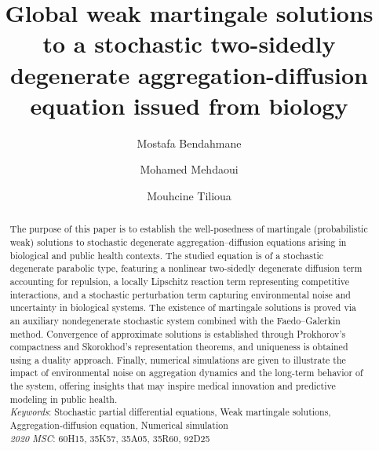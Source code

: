 \documentclass[10pt,number,preprint,times]{elsarticle}
\date{}
\numberwithin{equation}{section} %
\begin{document}
	\maketitle
		\begin{abstract}
		The purpose of this paper is to establish the well-posedness of martingale (probabilistic weak) solutions to stochastic degenerate aggregation–diffusion equations arising in biological and public health contexts. The studied equation is of a stochastic degenerate parabolic type, featuring a nonlinear two-sidedly degenerate diffusion term accounting for repulsion, a locally Lipschitz reaction term representing competitive interactions, and a stochastic perturbation term capturing environmental noise and uncertainty in biological systems. The existence of martingale solutions is proved via an auxiliary nondegenerate stochastic system combined with the Faedo–Galerkin method. Convergence of approximate solutions is established through Prokhorov’s compactness and Skorokhod’s representation theorems, and uniqueness is obtained using a duality approach. Finally, numerical simulations are given to illustrate the impact of environmental noise on aggregation dynamics and the long-term behavior of the system, offering insights that may inspire medical innovation and predictive modeling in public health. \\[1ex] 
		\textit{Keywords}: 	Stochastic partial differential equations,  Weak martingale solutions, Aggregation-diffusion equation, Numerical simulation\\
		\textit{2020 MSC}: 60H15, 35K57, 35A05, 35R60, 92D25
	\end{abstract}
	\begin{frontmatter}
\title{Global weak martingale solutions to a stochastic two-sidedly degenerate aggregation-diffusion equation issued from biology}
	
	
	\author{Mostafa Bendahmane }
	\address{Institut de Mathématiques de Bordeaux, Université de Bordeaux, 33076 Bordeaux Cedex, France}
	
	
	\author{Mohamed Mehdaoui}
	\address{Euromed University of Fez, UEMF, Fez, Morocco}
	\address{MAMCS Group, FST Errachidia, Moulay Ismail University of Meknes, P.O. Box 509, Boutalamine 52000, Errachidia, Morocco}


	
	\author{Mouhcine Tilioua}
	\address{MAMCS Group, FST Errachidia, Moulay Ismail University of Meknes, P.O. Box 509, Boutalamine 52000, Errachidia, Morocco}
	
	
	
	
\end{frontmatter}
\end{document}
